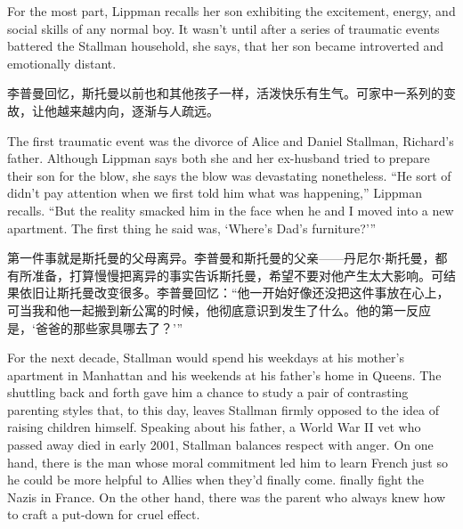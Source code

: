 \ifdefined\eng
For the most part, Lippman recalls her son exhibiting the excitement, energy, and social skills of any normal boy. It wasn't until after a series of traumatic events battered the Stallman household, she says, that her son became introverted and emotionally distant.
\fi

\ifdefined\chs
李普曼回忆，斯托曼以前也和其他孩子一样，活泼快乐有生气。可家中一系列的变故，让他越来越内向，逐渐与人疏远。
\fi

\ifdefined\eng
The first traumatic event was the divorce of Alice and Daniel Stallman, Richard's father. Although Lippman says both she and her ex-husband tried to prepare their son for the blow, she says the blow was devastating nonetheless. ``He sort of didn't pay attention when we first told him what was happening,'' Lippman recalls. ``But the reality smacked him in the face when he and I moved into a new apartment. The first thing he said was, `Where's Dad's furniture?'\hspace{0.01in}''
\fi

\ifdefined\chs
第一件事就是斯托曼的父母离异。李普曼和斯托曼的父亲——丹尼尔⋅斯托曼，都有所准备，打算慢慢把离异的事实告诉斯托曼，希望不要对他产生太大影响。可结果依旧让斯托曼改变很多。李普曼回忆：``他一开始好像还没把这件事放在心上，可当我和他一起搬到新公寓的时候，他彻底意识到发生了什么。他的第一反应是，`爸爸的那些家具哪去了？'\hspace{0.01in}''
\fi

\ifdefined\eng
For the next decade, Stallman would spend his weekdays at his mother's apartment in Manhattan and his weekends at his father's home in Queens. The shuttling back and forth gave him a chance to study a pair of contrasting parenting styles that, to this day, leaves Stallman firmly opposed to the idea of raising children himself. Speaking about his father, a World War II vet who \ifdefined\vone passed away \fi\ifdefined\vtwo died \fi in early 2001, Stallman balances respect with anger. On one hand, there is the man whose moral commitment led him to learn French just so he could be more helpful to Allies when they'd \ifdefined\vone finally come. \fi\ifdefined\vtwo finally fight the Nazis in France. \fi On the other hand, there was the parent who always knew how to craft a put-down for cruel effect.
\fi

